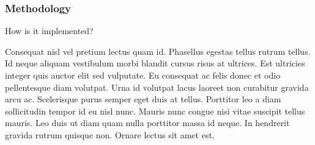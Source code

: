 \subsubsection*{Methodology}

How is it implemented?

\vskip 1cm

Consequat nisl vel pretium lectus quam id. Phasellus egestas tellus rutrum tellus. Id neque aliquam vestibulum morbi blandit cursus risus at ultrices. Est ultricies integer quis auctor elit sed vulputate. Eu consequat ac felis donec et odio pellentesque diam volutpat. Urna id volutpat lacus laoreet non curabitur gravida arcu ac. Scelerisque purus semper eget duis at tellus. Porttitor leo a diam sollicitudin tempor id eu nisl nunc. Mauris nunc congue nisi vitae suscipit tellus mauris. Leo duis ut diam quam nulla porttitor massa id neque. In hendrerit gravida rutrum quisque non. Ornare lectus sit amet est.




